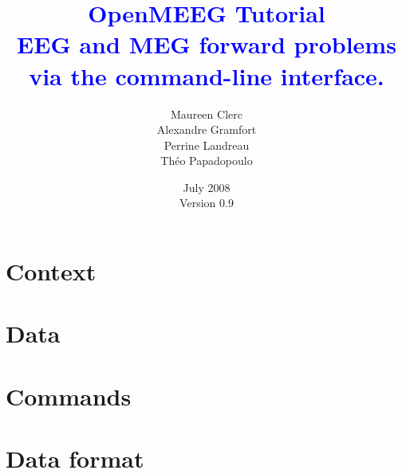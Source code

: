 \documentclass[10pt,a4paper,makeidx]{book}
\title{{\textbf{\textcolor{blue}{OpenMEEG Tutorial\\
        {\Large EEG and MEG forward problems\\
                via the command-line interface.}}}}}
\author{Maureen Clerc\\Alexandre Gramfort \\
        Perrine Landreau\\Théo Papadopoulo}
\date{July 2008\\
      Version 0.9}
\begin{document}
    \maketitle
    \tableofcontents

    \chapter{Context}
    

    \chapter{Data}
    

    \chapter{Commands}
    

    \appendix
    \chapter{Data format}
	\label{chap:format}
    
\end{document}
